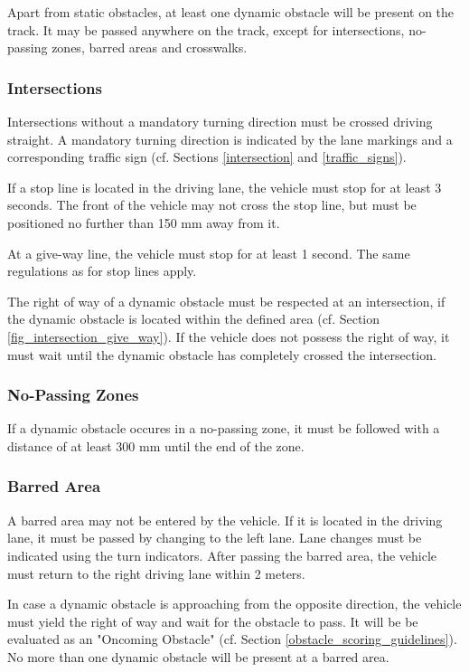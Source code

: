 Apart from static obstacles, at least one dynamic obstacle will be present on the track.
It may be passed anywhere on the track, except for intersections, no-passing zones, barred areas and crosswalks.

\subsubsection{Intersections}
\label{obstacle_course_intersections}

Intersections without a mandatory turning direction must be crossed driving straight.
A mandatory turning direction is indicated by the lane markings and a corresponding traffic sign (cf. Sections \ref{intersection} and \ref{traffic_signs}).

If a stop line is located in the driving lane, the vehicle must stop for at least 3 seconds.
The front of the vehicle may not cross the stop line, but must be positioned no further than 150 mm away from it.

At a give-way line, the vehicle must stop for at least 1 second.
The same regulations as for stop lines apply.

The right of way of a dynamic obstacle must be respected at an intersection, if the dynamic obstacle is located within the defined area (cf. Section \ref{fig_intersection_give_way}).
If the vehicle does not possess the right of way, it must wait until the dynamic obstacle has completely crossed the intersection.

\subsubsection{No-Passing Zones}
\label{event_no_passing_zones}

If a dynamic obstacle occures in a no-passing zone, it must be followed with a distance of at least 300 mm until the end of the zone.

\subsubsection{Barred Area}

A barred area may not be entered by the vehicle.
If it is located in the driving lane, it must be passed by changing to the left lane.
Lane changes must be indicated using the turn indicators.
After passing the barred area, the vehicle must return to the right driving lane within 2 meters.

	In case a dynamic obstacle is approaching from the opposite direction, the vehicle must yield the right of way and wait for the obstacle to pass.
	It will be be evaluated as an "Oncoming Obstacle" (cf. Section \ref{obstacle_scoring_guidelines}).
	No more than one dynamic obstacle will be present at a barred area.

